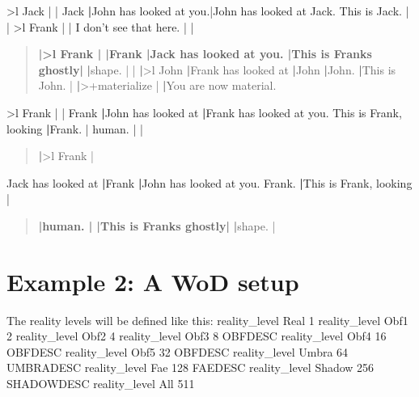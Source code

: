 \documentclass[letterpaper,10pt,english]{sphinxmanual}
\begin{document}
\sphinxAtStartPar
\textgreater{}l Jack                 |                       |
Jack                    {\color{red}\bfseries{}|}John has looked at you.|John has looked at Jack.
This is Jack.           |                       |
\textgreater{}l Frank                |                       |
I don’t see that here.  |                       |
\begin{quote}

\sphinxAtStartPar
{\color{red}\bfseries{}|\textgreater{}l Frank               |
|Frank                  |Jack has looked at you.
|This is Frank\textquotesingle{}s ghostly|}
{\color{red}\bfseries{}|}shape.                 |
|                       {\color{red}\bfseries{}|}\textgreater{}l John
{\color{red}\bfseries{}|}Frank has looked at    {\color{red}\bfseries{}|}John
{\color{red}\bfseries{}|}John.                  {\color{red}\bfseries{}|}This is John.
|                       {\color{red}\bfseries{}|}\textgreater{}+materialize
|                       {\color{red}\bfseries{}|}You are now material.
\end{quote}

\sphinxAtStartPar
\textgreater{}l Frank                |                       |
Frank                   {\color{red}\bfseries{}|}John has looked at     {\color{red}\bfseries{}|}Frank has looked at you.
This is Frank, looking  {\color{red}\bfseries{}|}Frank.                 |
human.                  |                       |
\begin{quote}

\sphinxAtStartPar
{\color{red}\bfseries{}|}\textgreater{}l Frank               |
\end{quote}

\sphinxAtStartPar
Jack has looked at      {\color{red}\bfseries{}|}Frank                  {\color{red}\bfseries{}|}John has looked at you.
Frank.                  {\color{red}\bfseries{}|}This is Frank, looking |
\begin{quote}

\sphinxAtStartPar
{\color{red}\bfseries{}|human.                 |
|This is Frank\textquotesingle{}s ghostly|}
{\color{red}\bfseries{}|}shape.                 |
\end{quote}


\section{Example 2: A WoD setup}
\label{\detokenize{19-reality:example-2-a-wod-setup}}
\sphinxAtStartPar
The reality levels will be defined like this:
reality\_level           Real 1
reality\_level           Obf1 2
reality\_level           Obf2 4
reality\_level           Obf3 8 OBFDESC
reality\_level           Obf4 16 OBFDESC
reality\_level           Obf5 32 OBFDESC
reality\_level           Umbra 64 UMBRADESC
reality\_level           Fae 128 FAEDESC
reality\_level           Shadow 256 SHADOWDESC
reality\_level           All 511
\end{document}

